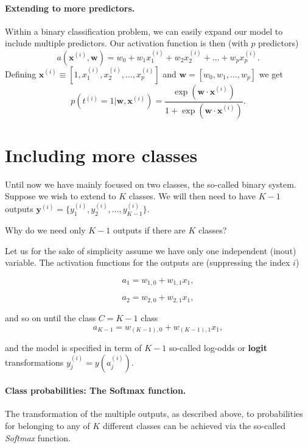 \documentclass[%
oneside,                 %
final,                   %
10pt]{article}
\newenvironment{question_mdfboxadmon}[1][]{
\begin{question_mdfboxmdframed}[frametitle=#1]
}
{
\end{question_mdfboxmdframed}
}
\begin{document}
\paragraph{Extending to more predictors.}
Within a binary classification problem, we can easily expand our model to include multiple predictors. Our activation function is then (with $p$ predictors)
\[
a( \boldsymbol{x}^{(i)}, \boldsymbol{w} ) = w_0 + w_1 x_1^{(i)} + w_2 x_2^{(i)} + \dots + w_p x_p^{(i)}.
\]
Defining $\boldsymbol{x}^{(i)} \equiv [1,x_1^{(i)}, x_2^{(i)}, \dots, x_p^{(i)}]$ and $\boldsymbol{w}=[w_0, w_1, \dots, w_p]$ we get
\[
p(t^{(i)}=1 | \boldsymbol{w}, \boldsymbol{x}^{(i)}) = \frac{ \exp{ \left( \boldsymbol{w} \cdot \boldsymbol{x}^{(i)} \right) }}{ 1 + \exp{ \left( \boldsymbol{w} \cdot \boldsymbol{x}^{(i)} \right) } }.
\]

\section{Including more classes}

Until now we have mainly focused on two classes, the so-called binary
system. Suppose we wish to extend to $K$ classes.  We will then need to have $K-1$ outputs $\boldsymbol{y}^{(i)} = \{ y_1^{(i)}, y_2^{(i)}, \ldots, y_{K-1}^{(i)} \}$. 


\begin{question_mdfboxadmon}[Question]
Why do we need only $K-1$ outputs if there are $K$ classes?
\end{question_mdfboxadmon} %



Let us for the sake of simplicity assume we have only one independent (inout) variable. The activation functions for the outputs are (suppressing the index $i$)

\[
a_1 = w_{1,0}+w_{1,1}x_1,
\]

\[
a_2 = w_{2,0}+w_{2,1}x_1,
\]

and so on until the class $C=K-1$ class
\[
a_{K-1} = w_{(K-1),0}+w_{(K-1),1}x_1,
\]

and the model is specified in term of $K-1$ so-called log-odds or \textbf{logit} transformations $y_j^{(i)} = y(a_j^{(i)})$.


\paragraph{Class probabilities: The Softmax function.}
The transformation of the multiple outputs, as described above, to probabilities for belonging to any of $K$ different classes can be achieved via the so-called \emph{Softmax} function.
\end{document}
